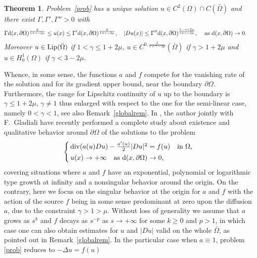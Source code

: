 \documentclass[10pt]{amsart}
\numberwithin{equation}{section}
\newtheorem{theorem}{Theorem}[section]
\theoremstyle{definition}
\newcommand{\dvg}{{\rm div}}
\begin{document}
\begin{theorem}
	\label{main}
Problem~\eqref{prob} has a unique solution $u\in C^2(\Omega)\cap C(\bar\Omega)$ and
there exist $\Gamma,\Gamma',\Gamma''>0$ with
\begin{align*}
\Gamma{\rm d}(x,\partial\Omega)^{{\frac{2}{1+\gamma-2\mu}}}\leq u(x)\leq \Gamma'
{\rm d}(x,\partial\Omega)^{{\frac{2}{1+\gamma-2\mu}}}, \quad
|Du(x)|\leq \Gamma''{\rm d}(x,\partial\Omega)^{\frac{1-\gamma+2\mu}{1+\gamma-2\mu}},&\quad\,\, \text{as 
${\rm d}(x,\partial\Omega)\to 0$.}  
\end{align*}
Moreover $u\in {\rm Lip}(\bar\Omega)$ if $1<\gamma\leq 1+2\mu$,
$u\in C^{0,\frac{2}{1+\gamma-2\mu}}(\bar\Omega)$ if $\gamma>1+2\mu$
and $u\in H^1_0(\Omega)$ if $\gamma<3-2\mu$.
\end{theorem}

\noindent
Whence, in some sense, the functions $a$ and $f$ compete for the vanishing rate of the solution and for its gradient upper bound,
near the boundary $\partial\Omega$. Furthermore, the range for Lipschitz continuity of $u$ up to the boundary is 
$\gamma\leq 1+2\mu$, $\gamma\neq 1$ thus enlarged with respect to the one for the semi-linear case, namely $0<\gamma<1$,
see also Remark~\ref{globalrem}.
In \cite{GlasquII}, the author jointly with F.\ Gladiali have recently performed a complete study about existence
and qualitative behavior around $\partial\Omega$ of the solutions to the problem
\begin{equation*}
\begin{cases}
\,\dvg(a(u)Du)-\frac{a'(u)}{2}|Du|^2=f(u)   & \text{in $\Omega$,} \\
\noalign{\vskip2pt}
\,\text{$u(x)\to+\infty$\quad as ${\rm d}(x,\partial\Omega)\to 0$,}    &
\end{cases}
\end{equation*}
covering situations where $a$ and $f$ have an exponential, polynomial or logarithmic 
type growth at infinity and a nonsingular behavior around the origin. On the contrary,
here we focus on the singular behavior at
the origin for $a$ and $f$ with the action of the source $f$ being in some sense predominant at zero upon the
diffusion $a$, due to the constraint $\gamma>1>\mu$. 
Without loss of generality we assume that $a$ grows as $s^k$ and $f$ decays as $s^{-p}$ as $s\to+\infty$
for some $k\geq 0$ and $p>1$, in which case one can also obtain estimates for $u$ and $|Du|$ valid
on the whole $\bar\Omega$, as pointed out in  Remark~\ref{globalrem}.
In the particular case when $a\equiv 1$, problem \eqref{prob} reduces to $-\Delta u =f(u)$
\end{document}
